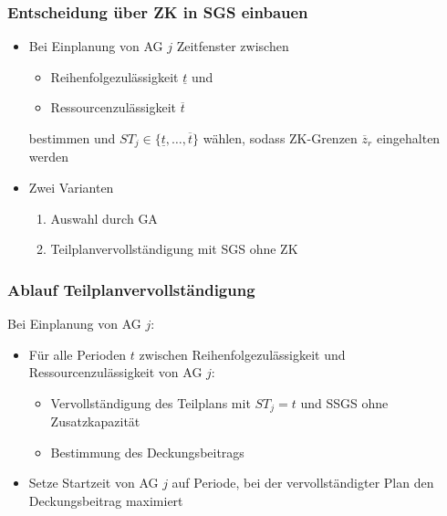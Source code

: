 
\begin{frame}[noframenumbering]
\frametitle{Entscheidung über ZK in SGS einbauen}
\begin{itemize}
\item Bei Einplanung von AG $j$ Zeitfenster zwischen
	\begin{itemize}
	\item Reihenfolgezulässigkeit $\underline{t}$ und
	\item Ressourcenzulässigkeit $\overline{t}$
	\end{itemize}
bestimmen und $ST_j \in \{ \underline{t}, \ldots, \overline{t} \}$ wählen, sodass ZK-Grenzen $\overline{z}_r$ eingehalten werden\\[8mm]
\item Zwei Varianten
\begin{enumerate}
	\item Auswahl durch GA 
	\item Teilplanvervollständigung mit SGS ohne ZK
	\end{enumerate}
\end{itemize}
\end{frame}

\begin{frame}[noframenumbering]
	\frametitle{Ablauf Teilplanvervollständigung}
	Bei Einplanung von AG $j$:
	\vspace*{2mm}
	\begin{itemize}
		\item Für alle Perioden $t$ zwischen Reihenfolgezulässigkeit und Ressourcenzulässigkeit von AG $j$:
		\begin{itemize}
			\item Vervollständigung des Teilplans mit $ST_j=t$ und SSGS ohne Zusatzkapazität
			\item Bestimmung des Deckungsbeitrags\\[3mm]
		\end{itemize}
		\item Setze Startzeit von AG $j$ auf Periode, bei der vervollständigter Plan den Deckungsbeitrag maximiert
	\end{itemize}
\end{frame}



